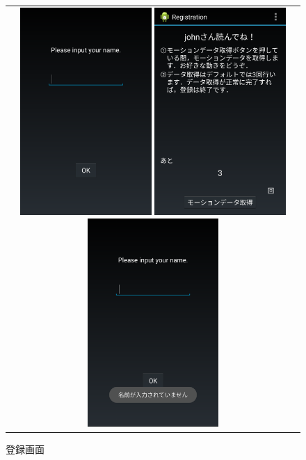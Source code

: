 \begin{figure}[bthp]
  \centering
  \begin{tabular}{c}
    \begin{minipage}{0.33\hsize}
      \centering
      \includegraphics[bb=0 0 1080 1705, width=5cm]{Screenshots/reg-input-name.pdf}
      \caption{ユーザ名入力画面}
      \label{reg-input-name}
    \end{minipage}
    \begin{minipage}{0.33\hsize}
      \centering
      \includegraphics[bb=0 0 1080 1705, width=5cm]{Screenshots/registration.pdf}
      \caption{登録画面}
      \label{registration}
    \end{minipage}
    \begin{minipage}{0.33\hsize}
      \centering
      \includegraphics[bb=0 0 1080 1705, width=5cm]{Screenshots/reg-input-name-toast.pdf}

\end{minipage}
\end{tabular}
\end{figure}
